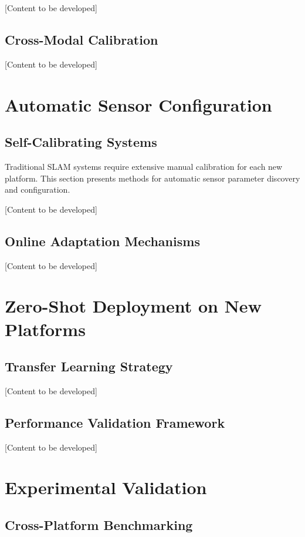 [Content to be developed]

\subsection{Cross-Modal Calibration}

[Content to be developed]

\section{Automatic Sensor Configuration}

\subsection{Self-Calibrating Systems}

Traditional SLAM systems require extensive manual calibration for each new platform. This section presents methods for automatic sensor parameter discovery and configuration.

[Content to be developed]

\subsection{Online Adaptation Mechanisms}

[Content to be developed]

\section{Zero-Shot Deployment on New Platforms}

\subsection{Transfer Learning Strategy}

[Content to be developed]

\subsection{Performance Validation Framework}

[Content to be developed]

\section{Experimental Validation}

\subsection{Cross-Platform Benchmarking}

